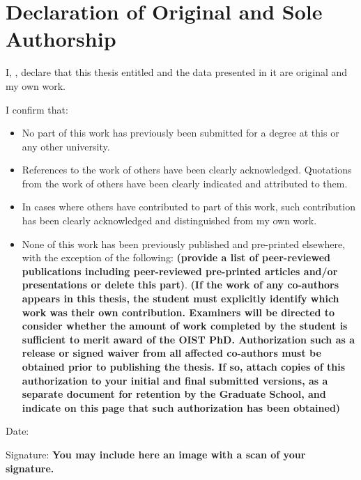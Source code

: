 \chapter*{Declaration of Original and Sole Authorship}

I, \name, declare that this thesis entitled \emph{\thesistitle} and the data presented in it are original and my own work.


I confirm that:
\begin{itemize}
    \item No part of this work has previously been submitted for a degree at this or any other university.
    \item References to the work of others have been clearly acknowledged. Quotations from the work of others have been clearly indicated and attributed to them.
    \item In cases where others have contributed to part of this work, such contribution has been clearly acknowledged and distinguished from my own work.
    \item None of this work has been previously published and pre-printed elsewhere, with the exception of the following: \textbf{(provide a list of peer-reviewed publications including peer-reviewed pre-printed articles and/or presentations or delete this part)}.  \textbf{(If the work of any co-authors appears in this thesis, the student must explicitly identify which work was their own contribution. Examiners will be directed to consider whether the amount of work completed by the student is sufficient to merit award of the OIST PhD. Authorization such as a release or signed waiver from all affected co-authors must be obtained prior to publishing the thesis.  If so, attach copies of this authorization to your initial and final submitted versions, as a separate document for retention by the Graduate School, and indicate on this page that such authorization has been obtained)}
\end{itemize}

Date:  \submissiondate

Signature: \textbf{You may include here an image with a scan of your signature.}
